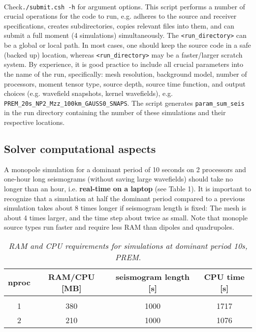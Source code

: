 \documentclass[11pt,letter,fleqn,english,notitlepage]{article}
\begin{document}
\\ 
Check{\tt ./submit.csh -h} for argument options. 
This script performs a number of crucial operations for the code to run, e.g. adheres to 
the source and receiver specifications, creates subdirectories, copies relevant files into them,
and can submit a full moment (4 simulations) simultaneously.
The {\tt <run\_directory>} can be a global or local path. In most cases, one should keep the source code in a 
safe (backed up) location, whereas {\tt <run\_directory>} may be a faster/larger scratch system. 
By experience, it is good practice to include all crucial parameters into the name 
of the run, specifically: mesh resolution, background model, number of processors, 
moment tensor type, source depth, source time function, and output choices (e.g. wavefield snapshots, kernel wavefields), e.g.
{\tt PREM\_20s\_NP2\_Mzz\_100km\_GAUSS0\_SNAPS}. 
The script generates {\tt param\_sum\_seis} in the run directory containing the number of these simulations 
and their respective locations. 

\subsection{Solver computational aspects}
\noindent A monopole simulation for a dominant period of 10 seconds on 2 processors and 
one-hour long seismograms (without saving large wavefields) should take no longer than 
an hour, i.e. \textbf{real-time on a laptop} (see Table 1). 
It is important to recognize that a simulation at half the dominant period compared to a previous simulation 
takes about 8 times longer if seismogram length is fixed: The mesh is about 4 times larger, and the time step about twice as small.
Note that monople source types run faster and require less RAM than dipoles and quadrupoles.\\

\begin{table*}[htb] 
\begin{minipage}{150mm}
\caption{ \textit{RAM and CPU requirements for simulations at dominant period 10s, PREM}.}
\label{apptable:matrix_op}
\vspace*{.2cm}
\begin{tabular}{@{}cccc}
nproc & RAM/CPU [MB] & seismogram length [s]& CPU time [s]\\
\hline\\
1 & 380 & 1000 & 1717\\
2 & 210 & 1000 & 1076
\end{tabular}
\end{minipage}
\end{table*}
\end{document}
